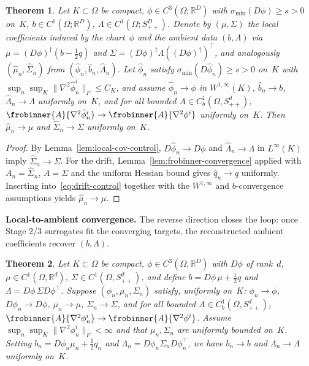 \documentclass[11pt]{article}
\newcommand{\Om}{\Omega}
\newcommand{\Rd}{\mathbb{R}^d}
\newcommand{\RD}{\mathbb{R}^D}
\newcommand{\norm}[1]{\lVert#1\rVert}
\newcommand{\sigmin}{\sigma_{\min}}
\newtheorem{thm}{Theorem}[section]
\begin{document}
\begin{thm}\label{thm:ambient-to-local-conv}
Let $K\subset\Om$ be compact, $\phi\in C^3(\Om;\RD)$
with $\sigmin(D\phi)\ge s>0$ on~$K$,
$b\in C^1(\Om;\RD)$, $\Lambda\in C^1(\Om;S_{++}^D)$.
Denote by $(\mu,\Sigma)$ the local coefficients
induced by the chart~$\phi$ and the ambient data
$(b,\Lambda)$ via
$\mu=(D\phi)^\dagger(b-\tfrac12 q)$ and
$\Sigma=(D\phi)^\dagger\Lambda((D\phi)^\dagger)^\top$,
and analogously $(\hat\mu_n,\hat\Sigma_n)$ from
$(\hat\phi_n,\hat b_n,\hat\Lambda_n)$.
Let $\hat\phi_n$ satisfy $\sigmin(D\hat\phi_n)\ge s>0$
on~$K$ with
$\sup_n\sup_K\norm{\nabla^2\hat\phi_n^i}_F\le C_K$, and
assume
$\hat\phi_n\to\phi$ in $W^{1,\infty}(K)$,
$\hat b_n\to b$, $\hat\Lambda_n\to\Lambda$ uniformly
on~$K$, and for all bounded
$A\in C_b^1(\Om,S_{++}^d)$,
$\frobinner{A}{\nabla^2\hat\phi_n^i}\to
\frobinner{A}{\nabla^2\phi^i}$ uniformly on~$K$.
Then $\hat\mu_n\to\mu$ and $\hat\Sigma_n\to\Sigma$
uniformly on~$K$.
\end{thm}

\begin{proof}
By Lemma~\ref{lem:local-cov-control}, $D\hat\phi_n\to
D\phi$ and $\hat\Lambda_n\to\Lambda$ in $L^\infty(K)$
imply $\hat\Sigma_n\to\Sigma$.
For the drift,
Lemma~\ref{lem:frobinner-convergence} applied with
$A_n=\hat\Sigma_n$, $A=\Sigma$ and the uniform Hessian
bound gives $\hat q_n\to q$ uniformly.
Inserting into~\eqref{eq:drift-control} together with
the $W^{1,\infty}$ and $b$-convergence assumptions
yields $\hat\mu_n\to\mu$.
\end{proof}

\noindent\textbf{Local-to-ambient convergence.}
The reverse direction closes the loop: once Stage 2/3
surrogates fit the converging targets, the reconstructed
ambient coefficients recover $(b,\Lambda)$.

\begin{thm}\label{thm:local-to-ambient-conv}
Let $K\subset\Om$ be compact,
$\phi\in C^3(\Om,\RD)$ with $D\phi$ of rank~$d$,
$\mu\in C^1(\Om,\Rd)$, $\Sigma\in C^1(\Om,S_{++}^d)$,
and define
$b=D\phi\,\mu+\tfrac12 q$ and
$\Lambda=D\phi\,\Sigma D\phi^\top$.
Suppose $(\phi_n,\mu_n,\Sigma_n)$ satisfy, uniformly
on~$K$: $\phi_n\to\phi$, $D\phi_n\to D\phi$,
$\mu_n\to\mu$, $\Sigma_n\to\Sigma$, and for all
bounded $A\in C_b^1(\Om,S_{++}^d)$,
$\frobinner{A}{\nabla^2\phi_n^i}\to
\frobinner{A}{\nabla^2\phi^i}$.
Assume
$\sup_n\sup_K\norm{\nabla^2\phi_n^i}_F<\infty$ and
that $\mu_n,\Sigma_n$ are uniformly bounded on~$K$.
Setting $b_n=D\phi_n\mu_n+\tfrac12 q_n$ and
$\Lambda_n=D\phi_n\Sigma_n D\phi_n^\top$,
we have $b_n\to b$ and $\Lambda_n\to\Lambda$
uniformly on~$K$.
\end{thm}
\end{document}
